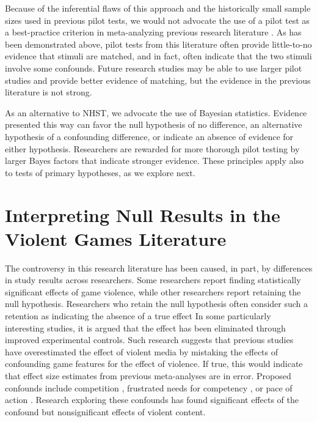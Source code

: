 \documentclass[fignum,nobf,man]{apa}
\begin{document}
Because of the inferential flaws of this approach and the historically small sample sizes used in previous pilot tests, we would not advocate the use of a pilot test as a best-practice criterion in meta-analyzing previous research literature \citep[c.f.]{Anderson:etal:2010}. As has been demonstrated above, pilot tests from this literature often provide little-to-no evidence that stimuli are matched, and in fact, often indicate that the two stimuli involve some confounds. Future research studies may be able to use larger pilot studies and provide better evidence of matching, but the evidence in the previous literature is not strong. %
 
As an alternative to NHST, we advocate the use of Bayesian statistics. Evidence presented this way can favor the null hypothesis of no difference, an alternative hypothesis of a confounding difference, or indicate an absence of evidence for either hypothesis. Researchers are rewarded for more thorough pilot testing by larger Bayes factors that indicate stronger evidence. These principles apply also to tests of primary hypotheses, as we explore next.

\section{Interpreting Null Results in the Violent Games Literature}
The controversy in this research literature has been caused, in part, by differences in study results across researchers. Some researchers report finding statistically significant effects of game violence, while other researchers report retaining the null hypothesis. Researchers who retain the null hypothesis often consider such a retention as indicating the absence of a true effect \citep[e.g.,][]{Adachi:Willoughby:2011,Elson:etal:2013,Ferguson:Rueda:2010,Valadez:Ferguson:2012} In some particularly interesting studies, it is argued that the effect has been eliminated through improved experimental controls. Such research suggests that previous studies have overestimated the effect of violent media by mistaking the effects of confounding game features for the effect of violence. If true, this would indicate that effect size estimates from previous meta-analyses \citep[e.g. r = .21,][]{Anderson:etal:2010} are in error. Proposed confounds include competition \citep{Adachi:Willoughby:2011}, frustrated needs for competency \citep{Przybylski:etal:2014}, or pace of action \citep{Elson:etal:2014}. Research exploring these confounds has found significant effects of the confound but nonsignificant effects of violent content. 
\end{document}
